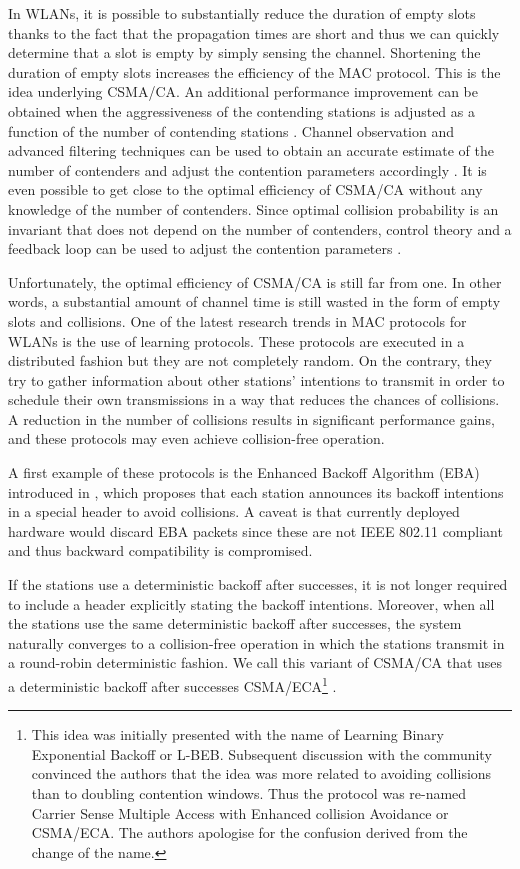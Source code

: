 \documentclass[journal]{IEEEtran}
\begin{document}
In WLANs, it is possible to substantially reduce the duration of empty slots thanks to the fact that the propagation times are short and thus we can quickly determine that a slot is empty by simply sensing the channel. Shortening the duration of empty slots increases the efficiency of the MAC protocol. This is the idea underlying CSMA/CA. An additional performance improvement can be obtained when the aggressiveness of the contending stations is adjusted as a function of the number of contending stations \cite{cali2000dti}. Channel observation and advanced filtering techniques can be used to obtain an accurate estimate of the number of contenders and adjust the contention parameters accordingly \cite{toledo2006aoi}. It is even possible to get close to the optimal efficiency of CSMA/CA without any knowledge of the number of contenders. Since optimal collision probability is an invariant that does not depend on the number of contenders, control theory and a feedback loop can be used to adjust the contention parameters \cite{patras2009cta}.

Unfortunately, the optimal efficiency of CSMA/CA is still far from one. In other words, a substantial amount of channel time is still wasted in the form of empty slots and collisions. One of the latest research trends in MAC protocols for WLANs is the use of learning protocols. These protocols are executed in a distributed fashion but they are not completely random. On the contrary, they try to gather information about other stations' intentions to transmit in order to schedule their own transmissions in a way that reduces the chances of collisions. A reduction in the number of collisions results in significant performance gains, and these protocols may even achieve collision-free operation.

A first example of these protocols is the Enhanced Backoff Algorithm (EBA) introduced in \cite{choi2005eei}, which proposes that each station announces its backoff intentions in a special header to avoid collisions. A caveat is that currently deployed hardware would discard EBA packets since these are not IEEE 802.11 compliant and thus backward compatibility is compromised.

If the stations use a deterministic backoff after successes, it is not longer required to include a header explicitly stating the backoff intentions. Moreover, when all the stations use the same deterministic backoff after successes, the system naturally converges to a collision-free operation in which the stations transmit in a round-robin deterministic fashion. We call this variant of CSMA/CA that uses a deterministic backoff after successes CSMA/ECA\footnote{This idea was initially presented with the name of Learning Binary Exponential Backoff or L-BEB. Subsequent discussion with the community convinced the authors that the idea was more related to avoiding collisions than to doubling contention windows. Thus the protocol was re-named Carrier Sense Multiple Access with Enhanced collision Avoidance or CSMA/ECA. The authors apologise for the confusion derived from the change of the name.} \cite{barcelo2008lba}.
\end{document}
